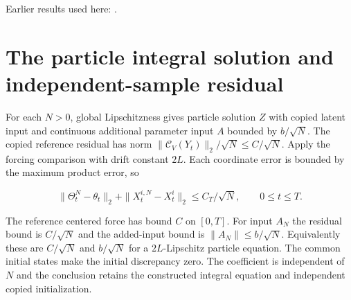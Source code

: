 \documentclass[11pt,a4paper]{article}
\begin{document}
Earlier results used here: \cite[Section~3.1.1]{LangevinLean2026IPLA}.

\section{\texorpdfstring{The particle integral solution and independent-sample residual}{The particle integral solution and independent-sample residual}}


For each \(N>0\), global Lipschitzness gives particle solution \(Z\) with copied latent input and continuous additional parameter input \(A\) bounded by \(b/\sqrt N\). The copied reference residual has norm \(\|\mathcal C_V(Y_t)\|_2/\sqrt N\le C/\sqrt N\). Apply the forcing comparison with drift constant \(2L\). Each coordinate error is bounded by the maximum product error, so

\[\|\Theta_t^N-\theta_t\|_2+\|X_t^{i,N}-X_t^i\|_2\le C_T/\sqrt N,\qquad0\le t\le T.\]

The reference centered force has bound \(C\) on \([0,T]\). For input \(A_N\) the residual bound is \(C/\sqrt N\) and the added-input bound is \(\|A_N\|\le b/\sqrt N\). Equivalently these are \(C/\sqrt N\) and \(b/\sqrt N\) for a \(2L\)-Lipschitz particle equation. The common initial states make the initial discrepancy zero. The coefficient is independent of \(N\) and the conclusion retains the constructed integral equation and independent copied initialization.
\end{document}
